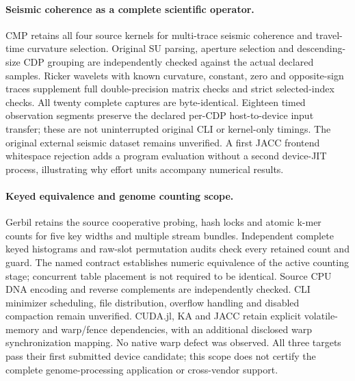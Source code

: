 \paragraph{Seismic coherence as a complete scientific operator.}
CMP retains all four source kernels for multi-trace seismic coherence and travel-time curvature selection. Original SU parsing, aperture selection and descending-size CDP grouping are independently checked against the actual declared samples. Ricker wavelets with known curvature, constant, zero and opposite-sign traces supplement full double-precision matrix checks and strict selected-index checks. All twenty complete captures are byte-identical. Eighteen timed observation segments preserve the declared per-CDP host-to-device input transfer; these are not uninterrupted original CLI or kernel-only timings. The original external seismic dataset remains unverified. A first JACC frontend whitespace rejection adds a program evaluation without a second device-JIT process, illustrating why effort units accompany numerical results.

\paragraph{Keyed equivalence and genome counting scope.}
Gerbil retains the source cooperative probing, hash locks and atomic k-mer counts for five key widths and multiple stream bundles. Independent complete keyed histograms and raw-slot permutation audits check every retained count and guard. The named contract establishes numeric equivalence of the active counting stage; concurrent table placement is not required to be identical. Source CPU DNA encoding and reverse complements are independently checked. CLI minimizer scheduling, file distribution, overflow handling and disabled compaction remain unverified. CUDA.jl, KA and JACC retain explicit volatile-memory and warp/fence dependencies, with an additional disclosed warp synchronization mapping. No native warp defect was observed. All three targets pass their first submitted device candidate; this scope does not certify the complete genome-processing application or cross-vendor support.

